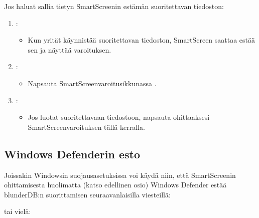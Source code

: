 \documentclass[letterpaper,10pt,finnish]{sphinxmanual}
\begin{document}
\sphinxAtStartPar
Jos haluat sallia tietyn SmartScreenin estämän suoritettavan tiedoston:
\begin{enumerate}
%
\item {} 
\sphinxAtStartPar
{}:
\begin{itemize}
\item {} 
\sphinxAtStartPar
Kun yrität käynnistää suoritettavan tiedoston, SmartScreen saattaa estää sen ja näyttää varoituksen.

\end{itemize}

\item {} 
\sphinxAtStartPar
{}:
\begin{itemize}
\item {} 
\sphinxAtStartPar
Napsauta SmartScreen\sphinxhyphen{}varoitusikkunassa .

\end{itemize}

\item {} 
\sphinxAtStartPar
{}:
\begin{itemize}
\item {} 
\sphinxAtStartPar
Jos luotat suoritettavaan tiedostoon, napsauta  ohittaaksesi SmartScreen\sphinxhyphen{}varoituksen tällä kerralla.

\end{itemize}

\end{enumerate}


\subsection{Windows Defenderin esto}
\label{\detokenize{annexe_windows_securite:blocage-windows-defender}}
\sphinxAtStartPar
Joissakin Windowsin suojausasetuksissa voi käydä niin, että SmartScreenin ohittamisesta huolimatta (katso edellinen osio) Windows Defender estää blunderDB:n suorittamisen seuraavanlaisilla viesteillä:

\begin{figure}[htbp]
\centering

\noindent{}
\end{figure}

\sphinxAtStartPar
tai vielä:
\end{document}
